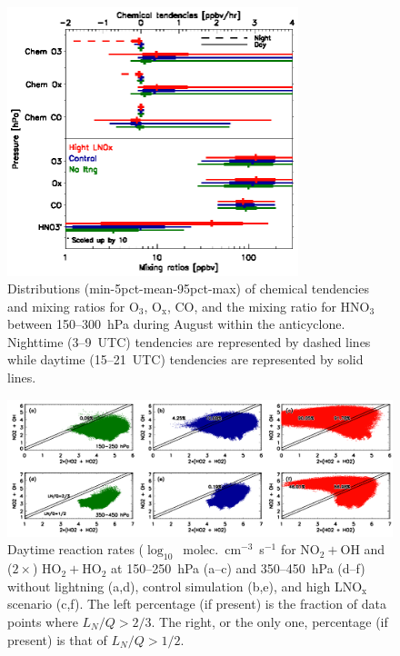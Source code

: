  \begin{figure}
 \noindent\includegraphics[width=20pc]{figures/ltngsens_diurnal.eps}
 \caption{Distributions (min-5pct-mean-95pct-max) of chemical tendencies
and mixing ratios for O$_3$, O$_{\mathrm{x}}$, CO, and the mixing ratio
for HNO$_3$ between 150--300~hPa during August within the
anticyclone. Nighttime (3--9~UTC) tendencies are represented by dashed
lines while daytime (15--21~UTC) tendencies are represented by solid
lines.}
 \label{fig:ltng_di}
 \end{figure}

 \begin{figure}
 \noindent\includegraphics[width=40pc]{figures/rxn.png}
 \caption{Daytime reaction rates ($\log_{10}$~molec.~cm$^{-3}$~s$^{-1}$
for NO$_2+$OH and ($2\times$) HO$_2+$HO$_2$ at 150--250~hPa (a--c)
and 350--450~hPa (d--f) without lightning (a,d), control simulation (b,e),
and high LNO$_{\mathrm{x}}$ scenario (c,f). The left percentage (if present) is the fraction
of data points where $L_N/Q>2/3$. The right, or the only one, percentage (if present) is that
of $L_N/Q>1/2$.}
 \label{fig:ltng_rxn}
 \end{figure}

